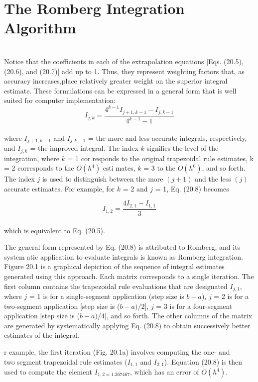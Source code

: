 \section{The Romberg Integration Algorithm}\\
Notice that the coefficients in each of the extrapolation equations [Eqs. (20.5), (20.6), and
(20.7)] add up to 1. Thus, they represent weighting factors that, as accuracy increases,place relatively greater weight on the superior integral estimate. These formulations can be
expressed in a general form that is well suited for computer implementation:
\begin{equation}
	\tag{20.8}
	I_{j,k}=\dfrac{4^{k-1}I_{j+1,k-1}-I_{j,k-1}}{4^{k-1}-1}
\end{equation}\\
where $I_{j+1,k−1}$ and $I_{j,k−1}$ = the more and less accurate integrals, respectively, and $I_{j,k}$ =
the improved integral. The index $k$ signifies the level of the integration, where $k$ = 1 corresponds to the original trapezoidal rule estimates, k = 2 corresponds to the $O(h^4)$ estimates, $k$ = 3 to the $O(h^6)$, and so forth. The index $j$ is used to distinguish between the more
$(j + 1)$ and the less $(j)$ accurate estimates. For example, for $k$ = 2 and $j$ = 1, Eq. (20.8)
becomes

	$$I_{1,2}=\dfrac{4I_{2,1}-I_{1,1}}{3}$$\\
which is equivalent to Eq. (20.5).

The general form represented by Eq. (20.8) is attributed to Romberg, and its systematic application to evaluate integrals is known as Romberg integration. Figure 20.1 is a
graphical depiction of the sequence of integral estimates generated using this approach.
Each matrix corresponds to a single iteration. The first column contains the trapezoidal rule
evaluations that are designated $I_{j,1}$, where $j$ = 1 is for a single-segment application (step
size is $b − a$), $j$ = 2 is for a two-segment application [step size is ($b − a)/2$], $j$ = 3 is for
a four-segment application [step size is ($b − a)/4$], and so forth. The other columns of the
matrix are generated by systematically applying Eq. (20.8) to obtain successively better
estimates of the integral.

r example, the first iteration (Fig. 20.1a) involves computing the one- and twosegment trapezoidal rule estimates ($I_{1,1}$ and $I_{2,1}$). Equation (20.8) is then used to compute
the element $I_{1,2 = 1.367467}$, which has an error of $O(h^4)$.
\pagebreak

